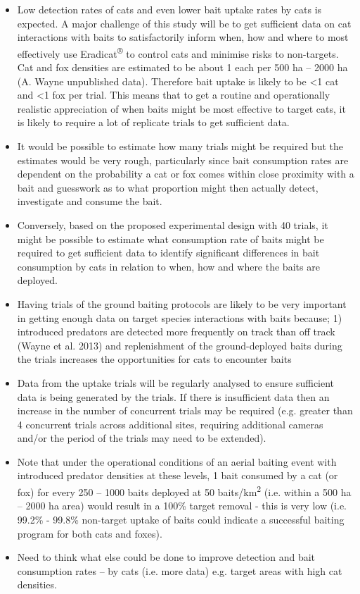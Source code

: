 \documentclass[version=last,
    paper=a4,                               %
    10pt,                                   %
    dvipsnames,
    oneside,                              %
    headings=openany,                       %
    open=any,
    BCOR=7mm,                               %
    DIV=15,     %
]{scrbook}
\begin{document}
\begin{itemize}
\itemsep1pt\parskip0pt
\item
  Low detection rates of cats and even lower bait uptake rates by cats
  is expected. A major challenge of this study will be to get sufficient
  data on cat interactions with baits to satisfactorily inform when, how
  and where to most effectively use Eradicat\textsuperscript{®} to
  control cats and minimise risks to non-targets. Cat and fox densities
  are estimated to be about 1 each per 500 ha -- 2000 ha (A. Wayne
  unpublished data). Therefore bait uptake is likely to be \textless{}1
  cat and \textless{}1 fox per trial. This means that to get a routine
  and operationally realistic appreciation of when baits might be most
  effective to target cats, it is likely to require a lot of replicate
  trials to get sufficient data.
\item
  It would be possible to estimate how many trials might be required but
  the estimates would be very rough, particularly since bait consumption
  rates are dependent on the probability a cat or fox comes within close
  proximity with a bait and guesswork as to what proportion might then
  actually detect, investigate and consume the bait.
\item
  Conversely, based on the proposed experimental design with 40 trials,
  it might be possible to estimate what consumption rate of baits might
  be required to get sufficient data to identify significant differences
  in bait consumption by cats in relation to when, how and where the
  baits are deployed.
\item
  Having trials of the ground baiting protocols are likely to be very
  important in getting enough data on target species interactions with
  baits because; 1) introduced predators are detected more frequently on
  track than off track (Wayne et al. 2013) and replenishment of the
  ground-deployed baits during the trials increases the opportunities
  for cats to encounter baits
\item
  Data from the uptake trials will be regularly analysed to ensure
  sufficient data is being generated by the trials. If there is
  insufficient data then an increase in the number of concurrent trials
  may be required (e.g. greater than 4 concurrent trials across
  additional sites, requiring additional cameras and/or the period of
  the trials may need to be extended).
\item
  Note that under the operational conditions of an aerial baiting event
  with introduced predator densities at these levels, 1 bait consumed by
  a cat (or fox) for every 250 -- 1000 baits deployed at 50
  baits/km\textsuperscript{2} (i.e. within a 500 ha -- 2000 ha area)
  would result in a 100\% target removal - this is very low (i.e. 99.2\%
  - 99.8\% non-target uptake of baits could indicate a successful
  baiting program for both cats and foxes).
\item
  Need to think what else could be done to improve detection and bait
  consumption rates -- by cats (i.e. more data) e.g. target areas with
  high cat densities.
\end{itemize}
\end{document}
